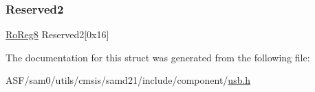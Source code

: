 \mbox{\label{struct_usb_device_endpoint_ae1a87a5a7a573aef81319e37b8a8e3d3}} 
\subsubsection{\texorpdfstring{Reserved2}{Reserved2}}
{\footnotesize\ttfamily \mbox{\hyperlink{group___s_a_m_d21_e15_a__definitions_ga0d957f1433aaf5d70e4dc2b68288442d}{Ro\+Reg8}} Reserved2\mbox{[}0x16\mbox{]}}



The documentation for this struct was generated from the following file\+:\begin{DoxyCompactItemize}
\item 
A\+S\+F/sam0/utils/cmsis/samd21/include/component/\mbox{\hyperlink{component_2usb_8h}{usb.\+h}}\end{DoxyCompactItemize}
